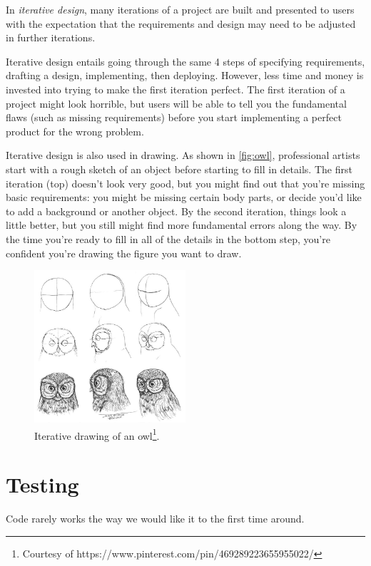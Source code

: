 \begin{definition}
In \emph{iterative design}, many iterations of a project are built and presented to users with the expectation that the requirements and design may need to be adjusted in further iterations. 
\end{definition}

Iterative design entails going through the same 4 steps of specifying requirements, drafting a design, implementing, then deploying. However, less time and money is invested into trying to make the first iteration perfect. The first iteration of a project might look horrible, but users will be able to tell you the fundamental flaws (such as missing requirements) before you start implementing a perfect product for the wrong problem. 

Iterative design is also used in drawing. As shown in \autoref{fig:owl}, professional artists start with a rough sketch of an object before starting to fill in details. The first iteration (top) doesn't look very good, but you might find out that you're missing basic requirements: you might be missing certain body parts, or decide you'd like to add a background or another object. By the second iteration, things look a little better, but you still might find more fundamental errors along the way. By the time you're ready to fill in all of the details in the bottom step, you're confident you're drawing the figure you want to draw. 

\begin{figure}
	\centering
	\includegraphics[width=0.5\textwidth]{images/owl.jpg}
	\caption{Iterative drawing of an owl\footnote{Courtesy of https://www.pinterest.com/pin/469289223655955022/}.}
	\label{fig:owl}
\end{figure}

\section{Testing}
Code rarely works the way we would like it to the first time around. 

